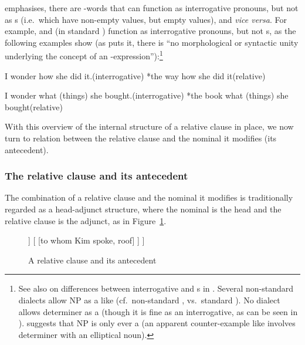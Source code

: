 \documentclass[output=paper,nonflat,draftmode]{./langsci/langscibook}
\begin{document}
\cite[490--493]{Sag:10b} emphasises, there are -words that can function as
interrogative pronouns, but not as s (i.e.\ which have non-empty
 values, but empty  values), and \emph{vice versa}. For example,
 and (in standard )  function as interrogative pronouns,
but not s, as the following examples show (as \citealt[493]{Sag:10b} puts it, there
is ``no morphological or syntactic unity underlying the concept of an 
-expression''):\footnote{See also \cite[81--85]{Mueller99b} on differences
  between interrogative and s in . Several non-standard 
  dialects allow NP  as a  like  (cf.\ non-standard
  , vs.\ standard ). No
  dialect allows determiner  as a  (though it is fine as an
  interrogative, as can be seen in ). \cite[491, note 10]{Sag:10b} suggests
  that NP  is only ever a  (an apparent counter-example like
    involves determiner  with an elliptical noun).}
\begin{exe}\ex\begin{xlist}
  \ex\label{x:rc-31} I wonder how she did it.\hfill(interrogative)
  \ex\label{x:rc-32} *the way how she did it\hfill(relative)
\end{xlist}\end{exe}
\begin{exe}\ex\begin{xlist}
  \ex\label{x:rc-33} I wonder what (things) she bought.\hfill(interrogative)
  \ex\label{x:rc-34} *the book what (things) she bought\hfill(relative)
\end{xlist}\end{exe}

With this overview of the internal structure of a relative clause in place, we now turn to
relation between the relative clause and the nominal it modifies (its antecedent).

\subsubsection{The relative clause and its antecedent}
\label{sec:rc-relative-clause-ante}

The combination of a relative clause and the nominal it modifies is traditionally
regarded as a head-adjunct structure, where the nominal is the head and the
relative clause is the adjunct, as in Figure~\ref{fig:rc-2}.
\begin{figure}
  \begin{forest}  %
   [{\ibar{N}\subtag{1}} ,baseline
      [{\idx{2} \ibar{N}\subtag{1}}  [ {person} ] ]
      [{}
         [{to whom Kim spoke}, roof]
      ]
   ]
   \end{forest}
   \caption{A relative clause and its antecedent}
   \label{fig:rc-2}
 \end{figure}
 
\end{document}
